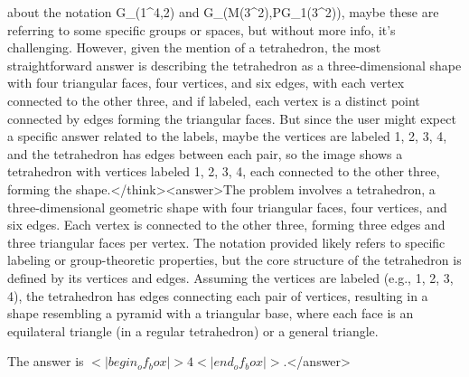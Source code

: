about the notation G_(1^4,2) and G_(M(3^2),PG_1(3^2)), maybe these are referring to some specific groups or spaces, but without more info, it's challenging. However, given the mention of a tetrahedron, the most straightforward answer is describing the tetrahedron as a three-dimensional shape with four triangular faces, four vertices, and six edges, with each vertex connected to the other three, and if labeled, each vertex is a distinct point connected by edges forming the triangular faces. But since the user might expect a specific answer related to the labels, maybe the vertices are labeled 1, 2, 3, 4, and the tetrahedron has edges between each pair, so the image shows a tetrahedron with vertices labeled 1, 2, 3, 4, each connected to the other three, forming the shape.</think><answer>The problem involves a tetrahedron, a three-dimensional geometric shape with four triangular faces, four vertices, and six edges. Each vertex is connected to the other three, forming three edges and three triangular faces per vertex. The notation provided likely refers to specific labeling or group-theoretic properties, but the core structure of the tetrahedron is defined by its vertices and edges. Assuming the vertices are labeled (e.g., 1, 2, 3, 4), the tetrahedron has edges connecting each pair of vertices, resulting in a shape resembling a pyramid with a triangular base, where each face is an equilateral triangle (in a regular tetrahedron) or a general triangle.  

The answer is \(<|begin_of_box|>4<|end_of_box|>\).</answer>